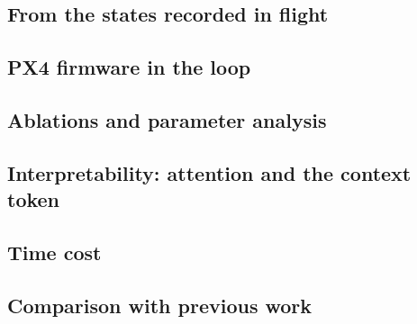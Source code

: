 \subsection{From the states recorded in flight}\label{sec:replay}


\subsection{PX4 firmware in the loop}\label{sec:sil}


\subsection{Ablations and parameter analysis}\label{sec:ablation}


\subsection{Interpretability: attention and the context token}\label{sec:interp}


\subsection{Time cost}\label{sec:time}


\subsection{Comparison with previous work}\label{sec:compare}

